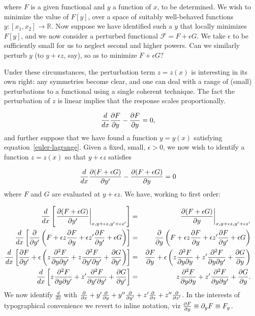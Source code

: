 \documentclass[pdflatex,sn-mathphys-num]{sn-jnl}%
\theoremstyle{thmstyleone}%
\theoremstyle{thmstyletwo}%
\theoremstyle{thmstylethree}%
\begin{document}
\noindent where $F$ is a given functional and $y$ a function of $x$,
to be determined.  We wish to minimize the value of $F[y]$, over a
space of suitably well-behaved functions
$y\colon\left[x_1,x_2\right]\longrightarrow\mathbb{R}$.  Now suppose
we have identified such a $y$ that locally minimizes $F[y]$, and we
now consider a perturbed functional $\mathcal{F}=F+\epsilon G$.  We
take $\epsilon$ to be sufficiently small for us to neglect second and
higher powers.  Can we similarly perturb $y$ (to $y+\epsilon z$, say),
so as to minimize $F+\epsilon G$?

Under these circumstances, the perturbation term $z=z(x)$ is
interesting in its own right: any symmetries become clear, and one can
deal with a range of (small) perturbations to a functional using a
single coherent technique.  The fact the perturbation of $z$ is linear
implies that the response scales proportionally.

\begin{equation}\label{euler-lagrange}
  \frac{d}{dx}\frac{\partial{F}}{\partial{y}}-\frac{\partial{F}}{\partial{y}} = 0,
\end{equation}
%
and further suppose that we have found a function $y=y(x)$ satisfying
equation~\ref{euler-lagrange}.  Given a fixed, small, $\epsilon>0$, we
now wish to identify a function $z=z(x)$ so that $y+\epsilon z$
satisfies

\begin{equation}
  \frac{d}{dx}\frac{\partial{(F+\epsilon G)}}{\partial{y'}}-\frac{\partial{(F+\epsilon G)}}{\partial{y}} = 0
\end{equation}
%
where $F$ and $G$ are evaluated at $y+\epsilon z$.  We have, working
to first order:

\begin{eqnarray}
\frac{d}{dx}\left[\left.\frac{\partial{(F+\epsilon G)}}{\partial{y'}}\right|_{x,y+\epsilon z,y'+\epsilon z'}\right]
&=& \left.\frac{\partial{(F+\epsilon G)}}{\partial{y}}\right|_{x,y+\epsilon z,y'+\epsilon z'}\nonumber\\
\frac{d}{dx}\left[\frac{\partial{}}{\partial{y'}}\left(F + \epsilon z\frac{\partial{F}}{\partial{y}} + \epsilon z'\frac{\partial{F}}{\partial{y'}}+\epsilon G\right)\right]
&=& \frac{\partial{}}{\partial{y}}\left(F + \epsilon z\frac{\partial{F}}{\partial{y}} + \epsilon z'\frac{\partial{F}}{\partial{y'}}+\epsilon G\right)\nonumber\\
\frac{d}{dx}\left[\frac{\partial{F}}{\partial{y'}} + \epsilon\left(z\frac{\partial^2{F}}{\partial{y}\partial{y'}} + z\frac{\partial^2{F}}{\partial{y'}\partial{y'}} + \frac{\partial{G}}{\partial{y'}}\right)\right]
&=& \frac{\partial{F}}{\partial{y}} + \epsilon\left(z\frac{\partial^2{F}}{\partial{y}\partial{y}} + z'\frac{\partial^2{F}}{\partial{y}\partial{y'}} + \frac{\partial{G}}{\partial{y}}\right)\nonumber\\
\frac{d}{dx}\left[z\frac{\partial^2{F}}{\partial{y}\partial{y'}} + z'\frac{\partial^2{F}}{\partial{y'}\partial{y'}} + \frac{\partial{G}}{\partial{y'}}\right]
&=& z\frac{\partial^2{F}}{\partial{y}\partial{y}} + z'\frac{\partial^2{F}}{\partial{y}\partial{y'}} + \frac{\partial{G}}{\partial{y}}.
\end{eqnarray}
%
We now identify $\frac{d}{dx}$ with $\frac{\partial{}}{\partial{x}} + y'\frac{\partial{}}{\partial{y}} +
y''\frac{\partial{}}{\partial{y'}} + z'\frac{\partial{}}{\partial{z}} + z''\frac{\partial{}}{\partial{z'}}$.  In the interests of
typographical convenience we revert to inline notation, viz
$\frac{\partial{F}}{\partial{y}}\equiv\partial_yF\equiv F_y$.
\end{document}
